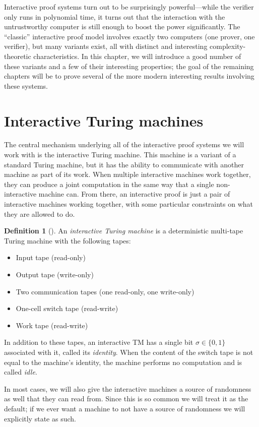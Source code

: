 \documentclass[english,12pt]{reedthesis}
\theoremstyle{plain}
\theoremstyle{definition}
\newtheorem{defn}[defn]{Definition}
\theoremstyle{remark}
\begin{document}
Interactive proof systems turn out to be surprisingly powerful---while the
verifier only runs in polynomial time, it turns out that the interaction with
the untrustworthy computer is still enough to boost the power significantly. The
``classic'' interactive proof model involves exactly two computers (one prover,
one verifier), but many variants exist, all with distinct and interesting
complexity-theoretic characteristics. In this chapter, we will introduce a good
number of these variants and a few of their interesting properties; the goal of
the remaining chapters will be to prove several of the more modern interesting
results involving these systems.

\section{Interactive Turing machines}\label{sec:interactive-tm}

The central mechanism underlying all of the interactive proof systems we will
work with is the interactive Turing machine. This machine is a variant of a
standard Turing machine, but it has the ability to communicate with another
machine as part of its work. When multiple interactive machines work together,
they can produce a joint computation in the same way that a single
non-interactive machine can. From there, an interactive proof is just a pair of
interactive machines working together, with some particular constraints on what
they are allowed to do.

\begin{defn}[{\cite[Def.\ 4.2.1]{Go01}}]\label{def:interactive-tm}
  An \emph{interactive Turing machine} is a deterministic multi-tape Turing
  machine with the following tapes:
  \begin{itemize}
    \item Input tape (read-only)
    \item Output tape (write-only)
    \item Two communication tapes (one read-only, one write-only)
    \item One-cell switch tape (read-write)
    \item Work tape (read-write)
  \end{itemize}
  In addition to these tapes, an interactive TM has a single bit $\sigma \in \{0, 1\}$
  associated with it, called its \emph{identity}.
  When the content of the switch tape is not equal to the machine's identity,
  the machine performs no computation and is called \emph{idle}.

  In most cases, we will also give the interactive machines a source of
  randomness as well that they can read from. Since this is so common we will
  treat it as the default; if we ever want a machine to not have a source of
  randomness we will explicitly state as such.
\end{defn}
\end{document}
